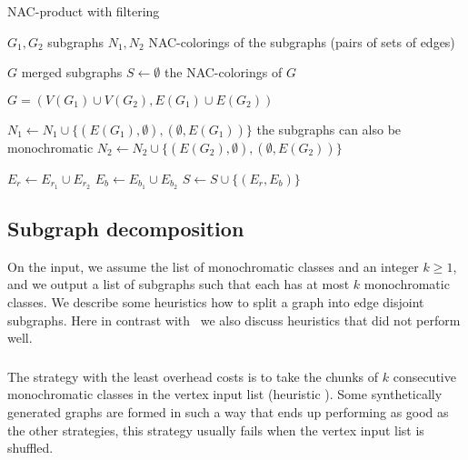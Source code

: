 \begin{algorithm}
	\caption{NAC-product with filtering}%
	\label{alg:coloring_product}
	\begin{algorithmic}[1]
		\Require{} $G_1, G_2$
		\Comment{} subgraphs
		\Require{} $N_1, N_2$
		\Comment{} NAC-colorings of the subgraphs (pairs of sets of edges)

		\Ensure{} $G$
		\Comment{} merged subgraphs
		\Ensure{} $S \gets \emptyset$
		\Comment{} the NAC-colorings of $G$

		\State{} $G = (V(G_1)\cup V(G_2), E(G_1) \cup E(G_2))$

		\State{} $N_1 \gets N_1 \cup \{(E(G_1), \emptyset), (\emptyset, E(G_1))\}$
		\Comment{} the subgraphs can also be monochromatic
		\State{} $N_2 \gets N_2 \cup \{(E(G_2), \emptyset), (\emptyset, E(G_2))\}$

		\State{} $E_r \gets E_{r_{1}} \cup E_{r_{2}}$
		\State{} $E_b \gets E_{b_{1}} \cup E_{b_{2}}$
		\State{} $S \gets S \cup \{(E_r, E_b)\}$
		\EndIf{}
		\EndFor{}
		\EndFor{}
	\end{algorithmic}
\end{algorithm}

\subsection{Subgraph decomposition}%
\label{sec:decomposition}

On the input, we assume the list of monochromatic classes
and an integer $k\geq 1$, and we output a list of subgraphs
such that each has at most $k$ monochromatic classes.
We describe some heuristics how to split a graph into edge disjoint subgraphs.
Here in contrast with~\cite{my_paper} we also discuss heuristics
that did not perform well.

\subsubsection{\None{}}

The strategy with the least overhead costs is to take the chunks of $k$ consecutive
monochromatic classes in the vertex input list (heuristic \None{}).
Some synthetically generated graphs are formed in such a way
that \None{} ends up performing as good as the other strategies,
this strategy usually fails when the vertex input list is shuffled.

